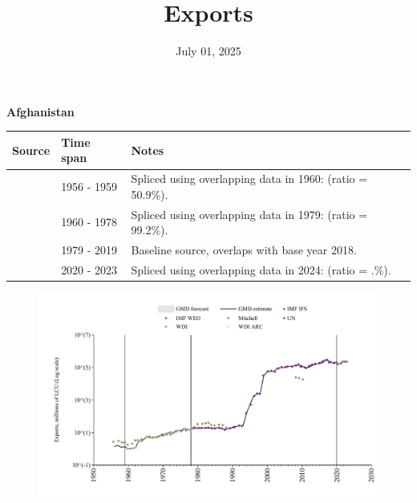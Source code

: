 \documentclass[12pt,a4paper,landscape]{article}
\begin{document}
\title{\Large Exports}
\date{July 01, 2025}
\maketitle
\thispagestyle{empty}

\clearpage
\setcounter{page}{1}
\hypersetup{colorlinks=true,linkcolor=blue,linktoc=all}
\label{toc}
\tableofcontents
\thispagestyle{empty}
\setcounter{page}{3}
\begin{adjustbox}{max totalsize={\paperwidth}{\paperheight},center}
\begin{minipage}[t][\textheight][t]{\textwidth}
\vspace*{0.5cm}
{}
\begin{center}
{\Large\bfseries Afghanistan}
\end{center}
\vspace{0.5cm}
\begin{table}[H]
\centering
\small
\begin{tabular}{|l|l|l|}
\hline
\textbf{Source} & \textbf{Time span} & \textbf{Notes} \\
\hline
\rowcolor{white}\cite{Mitchell}& 1956 - 1959 &Spliced using overlapping data in 1960: (ratio = 50.9\%).\\
\rowcolor{lightgray}\cite{WDI}& 1960 - 1978 &Spliced using overlapping data in 1979: (ratio = 99.2\%).\\
\rowcolor{white}\cite{UN}& 1979 - 2019 &Baseline source, overlaps with base year 2018.\\
\rowcolor{lightgray}\cite{WDI}& 2020 - 2023 &Spliced using overlapping data in 2024: (ratio = .\%).\\
\hline
\end{tabular}
\end{table}
\begin{figure}[H]
\centering
\includegraphics[width=\textwidth,height=0.6\textheight,keepaspectratio]{graphs/AFG_exports.pdf}
\end{figure}
\end{minipage}
\end{adjustbox}
\end{document}
